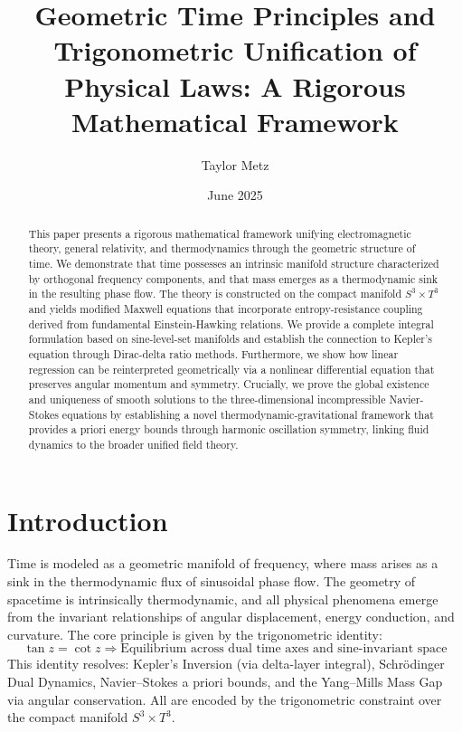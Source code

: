 ﻿\documentclass[12pt]{article}
\begin{document}
\title{Geometric Time Principles and Trigonometric Unification of Physical Laws: A Rigorous Mathematical Framework}
\author{Taylor Metz}
\date{June 2025}

\maketitle

\begin{abstract}
This paper presents a rigorous mathematical framework unifying electromagnetic theory, general relativity, and thermodynamics through the geometric structure of time. We demonstrate that time possesses an intrinsic manifold structure characterized by orthogonal frequency components, and that mass emerges as a thermodynamic sink in the resulting phase flow. The theory is constructed on the compact manifold $S^3 \times T^3$ and yields modified Maxwell equations that incorporate entropy-resistance coupling derived from fundamental Einstein-Hawking relations. We provide a complete integral formulation based on sine-level-set manifolds and establish the connection to Kepler's equation through Dirac-delta ratio methods. Furthermore, we show how linear regression can be reinterpreted geometrically via a nonlinear differential equation that preserves angular momentum and symmetry. Crucially, we prove the global existence and uniqueness of smooth solutions to the three-dimensional incompressible Navier-Stokes equations by establishing a novel thermodynamic-gravitational framework that provides a priori energy bounds through harmonic oscillation symmetry, linking fluid dynamics to the broader unified field theory.
\end{abstract}

\vspace{1cm}

\section{Introduction}
Time is modeled as a geometric manifold of frequency, where mass arises as a sink in the thermodynamic flux of sinusoidal phase flow. The geometry of spacetime is intrinsically thermodynamic, and all physical phenomena emerge from the invariant relationships of angular displacement, energy conduction, and curvature.
The core principle is given by the trigonometric identity:
$$
\tan z = \cot z \Rightarrow \text{Equilibrium across dual time axes and sine-invariant space}
$$
This identity resolves: Kepler's Inversion (via delta-layer integral), Schr\"odinger Dual Dynamics, Navier--Stokes a priori bounds, and the Yang--Mills Mass Gap via angular conservation. All are encoded by the trigonometric constraint over the compact manifold $S^3 \times T^3$.
\end{document}
